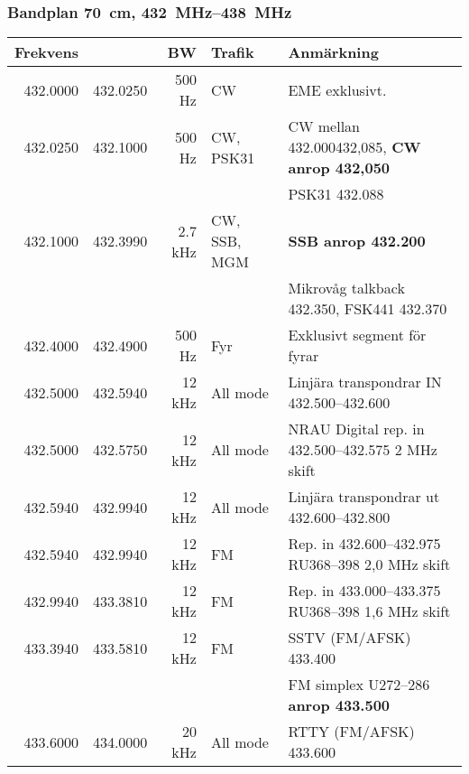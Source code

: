 \subsubsection{Bandplan \qty{70}{\centi\metre}, \SIrange{432}{438}{\mega\hertz}}
\begin{tabular}{rrrll}
	\textbf{Frekvens} &          & \textbf{BW} & \textbf{Trafik} & \textbf{Anmärkning}   \\ \hline

432.0000 & 432.0250 & 500 Hz  & CW           & EME exklusivt.                                               \\ \hline
432.0250 & 432.1000 & 500 Hz  & CW, PSK31    & CW mellan \num{432,000}{432,085}, \textbf{CW anrop 432,050}  \\
         &          &         &              & PSK31 \num{432,088}                                          \\ \hline
432.1000 & 432.3990 & 2.7 kHz & CW, SSB, MGM & \textbf{SSB anrop \num{432,200}}                             \\
         &          &         &              & Mikrovåg talkback \num{432,350}, FSK441 \num{432,370}        \\ \hline
432.4000 & 432.4900 & 500 Hz  & Fyr          & Exklusivt segment för fyrar                                  \\ \hline
432.5000 & 432.5940 & 12 kHz  & All mode     & Linjära transpondrar IN \numrange{432,500}{432,600}          \\ \hline
432.5000 & 432.5750 & 12 kHz  & All mode     & NRAU Digital rep. in \numrange{432,500}{432,575} 2 MHz skift \\ \hline
432.5940 & 432.9940 & 12 kHz  & All mode     & Linjära transpondrar ut \numrange{432,600}{432,800}          \\ \hline
432.5940 & 432.9940 & 12 kHz  & FM           & Rep. in \numrange{432,600}{432,975} RU368--398 2,0 MHz skift \\ \hline
432.9940 & 433.3810 & 12 kHz  & FM           & Rep. in \numrange{433,000}{433,375} RU368--398 1,6 MHz skift \\ \hline
433.3940 & 433.5810 & 12 kHz  & FM           & SSTV (FM/AFSK) \num{433,400}                                 \\
         &          &         &              & FM simplex U272--286 \textbf{anrop \num{433,500}}            \\ \hline
433.6000 & 434.0000 & 20 kHz  & All mode     & RTTY (FM/AFSK) \num{433,600}                                 \\

\end{tabular}
